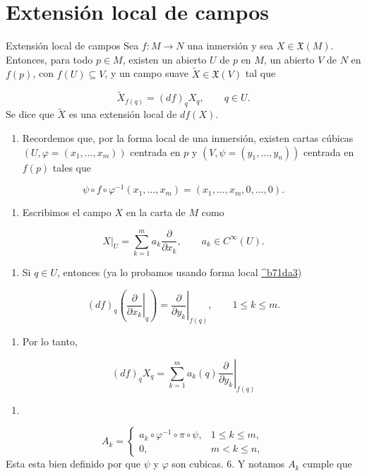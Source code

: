\section{Extensión local de campos}
\begin{booktheorem}{Extensión local de campos}
Sea $f:M\to N$ una inmersión y sea $X\in\mathfrak X(M)$. Entonces, para todo $p\in M$, existen un abierto $U$ de $p$ en $M$, un abierto $V$ de $N$ en $f(p)$, con $f(U)\subseteq V$, y un campo suave $\widetilde X\in\mathfrak X(V)$ tal que

\[
\widetilde X_{f(q)}=(df)_qX_q,\qquad q\in U.
\]
Se dice que $\widetilde X$ es una extensión local de $df(X)$.

\end{booktheorem}
\begin{bookproof}{}
\begin{enumerate}
\item Recordemos que, por la forma local de una inmersión, existen cartas cúbicas $(U,\varphi=(x_1,\ldots,x_m))$ centrada en $p$ y $(V,\psi=(y_1,\ldots,y_n))$ centrada en $f(p)$ tales que
\end{enumerate}
\[
\psi\circ f\circ\varphi^{-1}(x_1,\ldots,x_m)=(x_1,\ldots,x_m,0,\ldots,0).
\]
\begin{enumerate}[start=2]
\item Escribimos el campo $X$ en la carta de $M$ como
\end{enumerate}
\[
X|_U=\sum_{k=1}^m a_k\frac{\partial}{\partial x_k},\qquad a_k\in C^\infty(U).
\]
\begin{enumerate}[start=3]
\item Si $q\in U$, entonces (ya lo probamos usando forma local \hyperref[blk:b71da3]{\textasciicircum{}b71da3})
\end{enumerate}
\[
(df)_q\left(\left.\frac{\partial}{\partial x_k}\right|_q\right)=\left.\frac{\partial}{\partial y_k}\right|_{f(q)},\qquad 1\le k\le m.
\]
\begin{enumerate}[start=4]
\item Por lo tanto,
\end{enumerate}
\[
(df)_qX_q=\sum_{k=1}^m a_k(q)\left.\frac{\partial}{\partial y_k}\right|_{f(q)}
\]
\begin{enumerate}[start=5]
\item 
\end{enumerate}
\[
A_k=\begin{cases}a_k\circ\varphi^{-1}\circ\pi\circ\psi,&1\le k\le m,\\0,&m<k\le n,\end{cases}
\]
Esta esta bien definido por que $\psi$ y $\varphi$ son cubicas. 6. Y notamos $A_{k}$ cumple que


\end{bookproof}
